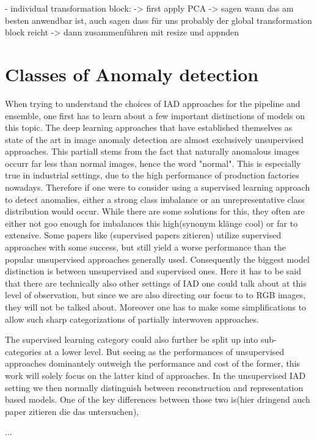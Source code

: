 - individual transformation block:
-> first apply PCA
-> sagen wann das am besten anwendbar ist, auch sagen dass für uns probably der global transformation block reicht
-> dann zusammenführen mit resize und appnden



\section{Classes of Anomaly detection}
When trying to understand the choices of IAD approaches for the pipeline and ensemble, one first has to learn about a few important distinctions of models on this topic.
The deep learning approaches that have established themselves as state of the art in image anomaly detection are almost exclusively unsupervised approaches. This partiall stems from the fact 
that naturally anomalous images occurr far less than normal images, hence the word "normal". This is especially true in industrial settings, due to the high performance of production factories 
nowadays. Therefore if one were to consider using a supervised learning approach to detect anomalies, either a strong class imbalance or an unrepresentative class distribution would occur.
While there are some solutions for this, they often are either not goo enough for imbalances this high(synonym klänge cool) or far to extensive. Some papers like (supervised papers zitieren)
utilize supervised approaches with some success, but still yield a worse performance than the popular unsupervised approaches generally used. Consequently the biggest model distinction is 
between unsupervised and supervised ones. Here it has to be said that there are technically also other settings of IAD one could talk about at this level of observation, but since we are also 
directing our focus to to RGB images, they will not be talked about. Moreover one has to make some simplifications to allow such sharp categorizations of partially interwoven approaches.

The supervised learning category could also further be split up into sub-categories at a lower level. But seeing as the performances of unsupervised approaches dominantely outweigh the 
performance and cost of the former, this work will solely focus on the latter kind of approaches. In the unsupervised IAD setting we then normally distinguish between reconstruction and 
representation based models. One of the key differences between those two is(hier dringend auch paper zitieren die das untersuchen), 


... 



